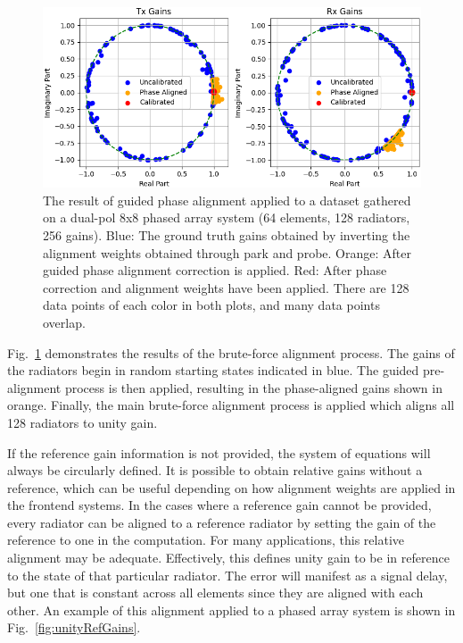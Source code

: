 \documentclass[journal]{IEEEtran}
\begin{document}
\begin{figure}
    \centering
    \includegraphics[width=1\linewidth]{guidedResults-dualpole.png}
    \caption{The result of guided phase alignment applied to a dataset gathered on a dual-pol 8x8 phased array system (64 elements, 128 radiators, 256 gains). Blue: The ground truth gains obtained by inverting the alignment weights obtained through park and probe. Orange: After guided phase alignment correction is applied. Red: After phase correction and alignment weights have been applied. There are 128 data points of each color in both plots, and many data points overlap.}
    \label{fig:guidedResults}
\end{figure}

Fig.~\ref{fig:guidedResults} demonstrates the results of the brute-force alignment process. The gains of the radiators begin in random starting states indicated in blue. The guided pre-alignment process is then applied, resulting in the phase-aligned gains shown in orange. Finally, the main brute-force alignment process is applied which aligns all 128 radiators to unity gain.

If the reference gain information is not provided, the system of equations will always be circularly defined. It is possible to obtain relative gains without a reference, which can be useful depending on how alignment weights are applied in the frontend systems. In the cases where a reference gain cannot be provided, every radiator can be aligned to a reference radiator by setting the gain of the reference to one in the computation. For many applications, this relative alignment may be adequate. Effectively, this defines unity gain to be in reference to the state of that particular radiator. The error will manifest as a signal delay, but one that is constant across all elements since they are aligned with each other. An example of this alignment applied to a phased array system is shown in Fig.~\ref{fig:unityRefGains}.
\end{document}
